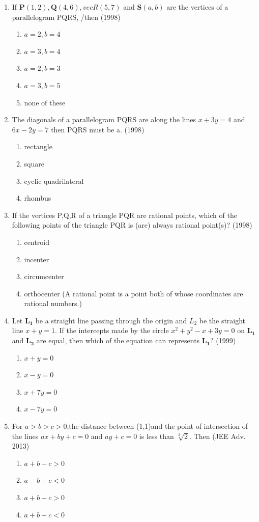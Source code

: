 \documentclass[12pt]{article}
\let\vec\mathbf
\begin{document}
\begin{enumerate}
\item  If $\vec{P}(1,2),\vec{Q}(4,6),vec{R}(5,7)$ and $\vec{S}(a,b)$ are the vertices of a parallelogram PQRS, /then (1998)\\
\begin{enumerate}
\item $a=2,b=4$
\item $a=3,b=4$ 
\item $a=2,b=3$
\item $a=3,b=5$
\item none of these
\end{enumerate}
\item The diagonals of a parallelogram PQRS are along the lines $x+3y=4$ and $6x-2y=7$ then PQRS must be a. (1998)\\
\begin{enumerate}
\item rectangle
\item square
\item cyclic quadrilateral
\item rhombus
\end{enumerate}
\item If the vertices P,Q,R of a triangle PQR are rational points, which of the following points of the triangle PQR is (are) always rational point(s)? (1998)\\
\begin{enumerate}
\item centroid 
\item incenter
\item circumcenter 
\item orthocenter
(A rational point is a point both of whose coordinates are rational numbers.)
\end{enumerate}
\item  Let $\vec{L_1}$ be a straight line passing through the origin and $L_2$ be the straight line $x+y=1$. If the intercepts made by the circle $x^2+y^2-x+3y=0$ on $\vec{L_1}$ and $\vec{L_2}$ are equal, then which of the equation can represents $\vec{L_1}$? (1999)\\
\begin{enumerate}
\item $x+y=0$   
\item $x-y=0$ 
\item $x+7y=0$  
\item $x-7y=0$
\end{enumerate}
\item For $a>b>c>0$,the distance between (1,1)and the point of intersection of the lines $ax+by+c=0$ and $ay+c=0$ is less than $\sqrt[2]{2}$. Then (JEE Adv. 2013)\\
\begin{enumerate}
\item $a+b-c>0$ 
\item $a-b+c<0$
\item $a+b-c>0$
\item $a+b-c<0$
\end{enumerate}

\iffalse
\end{enumerate}
\end{document}
